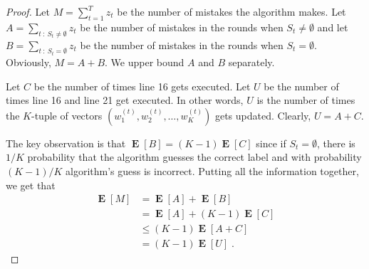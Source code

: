 \documentclass[12pt]{article}
\DeclareMathOperator*{\Exp}{\mathbf{E}}  %
\begin{document}
\begin{proof}
Let $M = \sum_{t=1}^T z_t$ be the number of mistakes the algorithm makes. Let $A
= \sum_{t ~:~ S_t \neq \emptyset} z_t$ be the number of mistakes in the rounds
when $S_t \neq \emptyset$ and let $B = \sum_{t ~:~ S_t = \emptyset} z_t$ be the
number of mistakes in the rounds when $S_t = \emptyset$. Obviously, $M = A + B$.
We upper bound $A$ and $B$ separately.

Let $C$ be the number of times line 16 gets executed. Let $U$ be the number of
times line 16 and line 21 get executed. In other words, $U$ is the number of
times the $K$-tuple of vectors $(w_1^{(t)}, w_2^{(t)}, \dots, w_K^{(t)})$ gets
updated. Clearly, $U = A + C$.

The key observation is that $\Exp[B] = (K-1) \Exp[C]$ since if $S_t =
\emptyset$, there is $1/K$ probability that the algorithm guesses the correct
label and with probability $(K-1)/K$ algorithm's guess is incorrect.
Putting all the information together, we get that
\begin{align*}
\Exp[M]
& = \Exp[A] + \Exp[B] \\
& = \Exp[A] + (K-1) \Exp[C]  \\
& \le (K-1) \Exp[A + C] \\
& = (K-1) \Exp[U]  \; .
\end{align*}


\end{proof}
\end{document}
